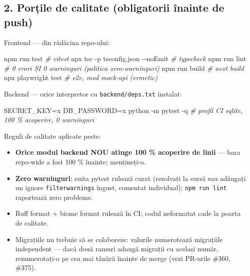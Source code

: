 \documentclass[
]{article}
\newenvironment{Shaded}{}{}
\newcommand{\AttributeTok}[1]{\textcolor[rgb]{0.49,0.56,0.16}{#1}}
\newcommand{\CommentTok}[1]{\textcolor[rgb]{0.38,0.63,0.69}{\textit{#1}}}
\newcommand{\ExtensionTok}[1]{#1}
\newcommand{\NormalTok}[1]{#1}
\newcommand{\OperatorTok}[1]{\textcolor[rgb]{0.40,0.40,0.40}{#1}}
\newcommand{\VariableTok}[1]{\textcolor[rgb]{0.10,0.09,0.49}{#1}}
\providecommand{\tightlist}{%
  \setlength{\itemsep}{0pt}\setlength{\parskip}{0pt}}
\begin{document}
\subsection{2. Porțile de calitate (obligatorii înainte de
push)}\label{2-porux21bile-de-calitate-obligatorii-uxeenainte-de-push}

Frontend --- din rădăcina repo-ului:

\begin{Shaded}
\begin{Highlighting}[]
\ExtensionTok{npm}\NormalTok{ run test                      }\CommentTok{\# vitest}
\ExtensionTok{npx}\NormalTok{ tsc }\AttributeTok{{-}p}\NormalTok{ tsconfig.json }\AttributeTok{{-}{-}noEmit} \CommentTok{\# typecheck}
\ExtensionTok{npm}\NormalTok{ run lint                      }\CommentTok{\# 0 erori ȘI 0 warninguri (politica zero{-}warninguri)}
\ExtensionTok{npm}\NormalTok{ run build                     }\CommentTok{\# next build}
\ExtensionTok{npx}\NormalTok{ playwright test               }\CommentTok{\# e2e, mod mock{-}api (ermetic)}
\end{Highlighting}
\end{Shaded}

Backend --- orice interpretor cu \texttt{backend/deps.txt} instalat:

\begin{Shaded}
\begin{Highlighting}[]
\VariableTok{SECRET\_KEY}\OperatorTok{=}\NormalTok{x }\VariableTok{DB\_PASSWORD}\OperatorTok{=}\NormalTok{x }\ExtensionTok{python} \AttributeTok{{-}m}\NormalTok{ pytest }\AttributeTok{{-}q}    \CommentTok{\# profil CI sqlite, 100 \% acoperire, 0 warninguri}
\end{Highlighting}
\end{Shaded}

Reguli de calitate aplicate peste:

\begin{itemize}
\tightlist
\item
  \textbf{Orice modul backend NOU atinge 100 \% acoperire de linii} ---
  bara repo-wide a fost 100 \% înainte; mențineți-o.
\item
  \textbf{Zero warninguri}: suita pytest rulează curat (rezolvați la
  sursă sau adăugați un ignore \texttt{filterwarnings} îngust, comentat
  individual); \texttt{npm\ run\ lint} raportează zero probleme.
\item
  Ruff format + biome format rulează în CI; codul neformatat cade la
  poarta de calitate.
\item
  Migrațiile nu trebuie să se colaboreze: valurile numerotează
  migrațiile independent --- dacă două ramuri adaugă migrații cu același
  număr, renumerotați-o pe cea mai tânără înainte de merge (vezi
  PR-urile \#360, \#375).
\end{itemize}
\end{document}
